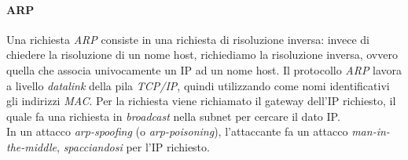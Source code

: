 \paragraph{ARP}
Una richiesta \textit{ARP} consiste in una richiesta di risoluzione inversa: invece di chiedere la risoluzione di un nome host, richiediamo la risoluzione inversa, ovvero quella che associa univocamente un IP ad un nome host. Il protocollo \textit{ARP} lavora a livello \textit{datalink} della pila \textit{TCP/IP}, quindi utilizzando come nomi identificativi gli indirizzi \textit{MAC}. Per la richiesta viene richiamato il gateway dell'IP richiesto, il quale fa una richiesta in \textit{broadcast} nella subnet per cercare il dato IP. \\
In un attacco \textit{arp-spoofing} (o \textit{arp-poisoning}), l'attaccante fa un attacco \textit{man-in-the-middle}, \textit{spacciandosi} per l'IP richiesto.